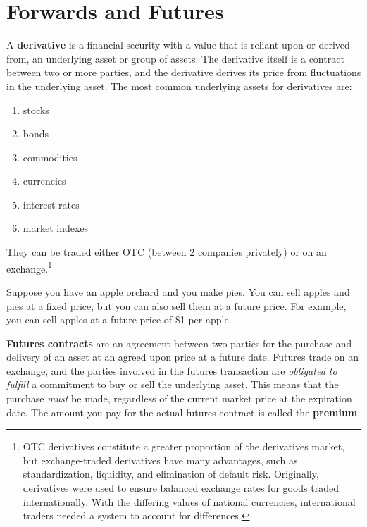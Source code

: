 \documentclass{article}
\begin{document}
\section{Forwards and Futures}

    \begin{definition}[Derivatives]
      A \textbf{derivative} is a financial security with a value that is reliant upon or derived from, an underlying asset or group of assets. The derivative itself is a contract between two or more parties, and the derivative derives its price from fluctuations in the underlying asset. The most common underlying assets for derivatives are: 
      \begin{enumerate}
        \item stocks
        \item bonds
        \item commodities
        \item currencies
        \item interest rates 
        \item market indexes 
      \end{enumerate}
      They can be traded either OTC (between 2 companies privately) or on an exchange.\footnote{OTC derivatives constitute a greater proportion of the derivatives market, but exchange-traded derivatives have many advantages, such as standardization, liquidity, and elimination of default risk. Originally, derivatives were used to ensure balanced exchange rates for goods traded internationally. With the differing values of national currencies, international traders needed a system to account for differences. }
    \end{definition}

    \begin{example} 
      Suppose you have an apple orchard and you make pies. You can sell apples and pies at a fixed price, but you can also sell them at a future price. For example, you can sell apples at a future price of \$1 per apple. 
    \end{example}

    \begin{definition}[Futures]
      \textbf{Futures contracts} are an agreement between two parties for the purchase and delivery of an asset at an agreed upon price at a future date. Futures trade on an exchange, and the parties involved in the futures transaction are \textit{obligated to fulfill} a commitment to buy or sell the underlying asset. This means that the purchase \textit{must} be made, regardless of the current market price at the expiration date. The amount you pay for the actual futures contract is called the \textbf{premium}. 
    \end{definition}
\end{document}
